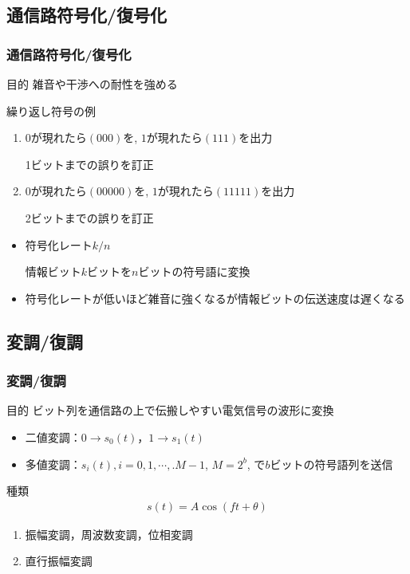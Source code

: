 \documentclass[dvipdfmx]{beamer}  %
\begin{document}
\subsection{通信路符号化/復号化}
\begin{frame}
	\frametitle{通信路符号化/復号化}
	
	\begin{block}{目的}
		雑音や干渉への耐性を強める
	\end{block}
	
	繰り返し符号の例
	\begin{enumerate}
		\item $0$が現れたら$(000)$を, $1$が現れたら$(111)$を出力
		
		1ビットまでの誤りを訂正
		\item $0$が現れたら$(00000)$を, $1$が現れたら$(11111)$を出力
		
		2ビットまでの誤りを訂正
	\end{enumerate}
	
	\begin{itemize}
		\item 符号化レート$k/n$
		
		情報ビット$k$ビットを$n$ビットの符号語に変換
		\item 符号化レートが低いほど雑音に強くなるが情報ビットの伝送速度は遅くなる
	\end{itemize}
\end{frame}

\subsection{変調/復調}
\begin{frame}
	\frametitle{変調/復調}
	\begin{block}{目的}
		ビット列を通信路の上で伝搬しやすい電気信号の波形に変換
	\end{block}
	
	\begin{itemize}
		\item 二値変調：$0\rightarrow s_0(t)$，$1\rightarrow s_1(t)$
		\item 多値変調：$s_i(t),i =0,1,\cdots,.M-1$, $M =2^b$, で$b$ビットの符号語列を送信
	\end{itemize}
	種類
	\begin{eqnarray*}
		s(t) = A\cos(f t+\theta)
	\end{eqnarray*}
	\begin{enumerate}
		\item 振幅変調，周波数変調，位相変調
		\item 直行振幅変調
	\end{enumerate}
\end{frame}
\end{document}
